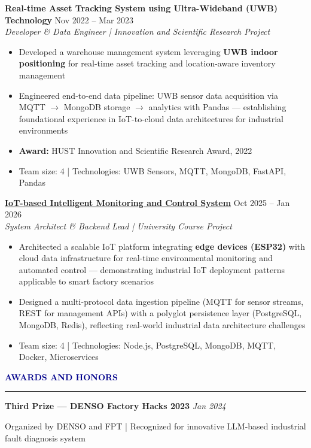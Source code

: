 \documentclass[11pt,letterpaper]{article}
\newcommand{\sectiontitle}[1]{
  \vspace{0.3em}
  {\large\textbf{\textcolor{darkblue}{#1}}}
  \vspace{0.2em}
  \hrule
  \vspace{0.3em}
}
\newcommand{\subsectiontitle}[2]{
  \textbf{#1} \hfill \textit{#2}
  \vspace{0.2em}
}
\newcommand{\entry}[4]{
  \textbf{#1} \hfill #2 \\
  \textit{#3} \\
  #4
  \vspace{0.3em}
}
\begin{document}
\entry
  {Real-time Asset Tracking System using Ultra-Wideband (UWB) Technology}
  {Nov 2022 -- Mar 2023}
  {Developer \& Data Engineer | Innovation and Scientific Research Project}
  {
    \begin{itemize}[leftmargin=1.5em, topsep=0pt, itemsep=0.2em]
      \item Developed a warehouse management system leveraging \textbf{UWB indoor positioning} for real-time asset tracking and location-aware inventory management
      \item Engineered end-to-end data pipeline: UWB sensor data acquisition via MQTT $\rightarrow$ MongoDB storage $\rightarrow$ analytics with Pandas --- establishing foundational experience in IoT-to-cloud data architectures for industrial environments
      \item \textbf{Award:} HUST Innovation and Scientific Research Award, 2022
      \item Team size: 4 | Technologies: UWB Sensors, MQTT, MongoDB, FastAPI, Pandas
    \end{itemize}
  }

\entry
  {\href{https://github.com/AndrewHaward2310/IoTSmartGardenSystem}{IoT-based Intelligent Monitoring and Control System}}
  {Oct 2025 -- Jan 2026}
  {System Architect \& Backend Lead | University Course Project}
  {
    \begin{itemize}[leftmargin=1.5em, topsep=0pt, itemsep=0.2em]
      \item Architected a scalable IoT platform integrating \textbf{edge devices (ESP32)} with cloud data infrastructure for real-time environmental monitoring and automated control --- demonstrating industrial IoT deployment patterns applicable to smart factory scenarios
      \item Designed a multi-protocol data ingestion pipeline (MQTT for sensor streams, REST for management APIs) with a polyglot persistence layer (PostgreSQL, MongoDB, Redis), reflecting real-world industrial data architecture challenges
      \item Team size: 4 | Technologies: Node.js, PostgreSQL, MongoDB, MQTT, Docker, Microservices
    \end{itemize}
  }

\sectiontitle{AWARDS AND HONORS}

\subsectiontitle{Third Prize --- DENSO Factory Hacks 2023}{Jan 2024}
Organized by DENSO and FPT | Recognized for innovative LLM-based industrial fault diagnosis system
\vspace{0.3em}
\end{document}
